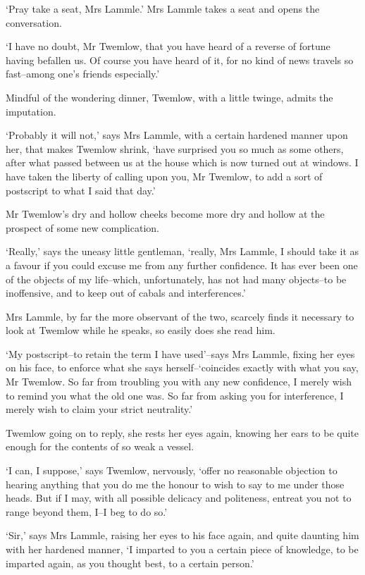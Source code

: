 ‘Pray take a seat, Mrs Lammle.’ Mrs Lammle takes a seat and opens the
conversation.

‘I have no doubt, Mr Twemlow, that you have heard of a reverse of
fortune having befallen us. Of course you have heard of it, for no kind
of news travels so fast--among one’s friends especially.’

Mindful of the wondering dinner, Twemlow, with a little twinge, admits
the imputation.

‘Probably it will not,’ says Mrs Lammle, with a certain hardened manner
upon her, that makes Twemlow shrink, ‘have surprised you so much as some
others, after what passed between us at the house which is now turned
out at windows. I have taken the liberty of calling upon you, Mr
Twemlow, to add a sort of postscript to what I said that day.’

Mr Twemlow’s dry and hollow cheeks become more dry and hollow at the
prospect of some new complication.

‘Really,’ says the uneasy little gentleman, ‘really, Mrs Lammle, I
should take it as a favour if you could excuse me from any further
confidence. It has ever been one of the objects of my life--which,
unfortunately, has not had many objects--to be inoffensive, and to keep
out of cabals and interferences.’

Mrs Lammle, by far the more observant of the two, scarcely finds it
necessary to look at Twemlow while he speaks, so easily does she read
him.

‘My postscript--to retain the term I have used’--says Mrs Lammle, fixing
her eyes on his face, to enforce what she says herself--‘coincides
exactly with what you say, Mr Twemlow. So far from troubling you with
any new confidence, I merely wish to remind you what the old one was. So
far from asking you for interference, I merely wish to claim your strict
neutrality.’

Twemlow going on to reply, she rests her eyes again, knowing her ears to
be quite enough for the contents of so weak a vessel.

‘I can, I suppose,’ says Twemlow, nervously, ‘offer no reasonable
objection to hearing anything that you do me the honour to wish to say
to me under those heads. But if I may, with all possible delicacy and
politeness, entreat you not to range beyond them, I--I beg to do so.’

‘Sir,’ says Mrs Lammle, raising her eyes to his face again, and quite
daunting him with her hardened manner, ‘I imparted to you a certain
piece of knowledge, to be imparted again, as you thought best, to a
certain person.’

